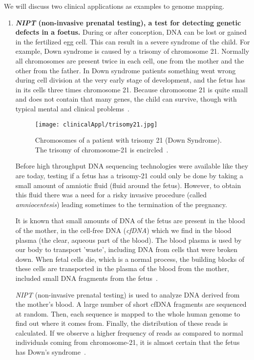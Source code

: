 We will discuss two clinical applications as examples to genome mapping.

\begin{enumerate}
	\item \textbf{\emph{NIPT} (non-invasive prenatal testing), a test for detecting genetic defects in a foetus.}\newline
	During or after conception, DNA can be lost or gained in the fertilized egg cell. This can result in a severe syndrome of the child. For example, Down syndrome is caused by a trisomy of chromosome 21. Normally all chromosomes are present twice in each cell, one from the mother and the other from the father. In Down syndrome patients something went wrong during cell division at the very early stage of development, and the fetus has in its cells three times chromosome 21. 
	Because chromosome 21 is quite small and does not contain that many genes, the child can survive, though with typical mental and clinical problems~\cite{Down}.
	
	\begin{figure}[H]
			\centering
		\texttt{[image: clinicalAppl/trisomy21.jpg]}
		\caption{Chromosomes of a patient with trisomy 21 (Down Syndrome). The trisomy of chromosome-21 is encircled~\cite{niptArtikel}.}
		\label{fig:tri21}
	\end{figure}
	
	
	Before high throughput DNA sequencing technologies were available like they are today, testing if a fetus has a trisomy-21 could only be done by taking a small amount of amniotic fluid (fluid around the fetus). However, to obtain this fluid there was a need for a risky invasive procedure (called \emph{amniocentesis}) leading sometimes to the termination of the pregnancy.
	
	It is known that small amounts of DNA of the fetus are present in the blood of the mother, in the cell-free DNA (\emph{cfDNA}) which we find in the blood plasma (the clear, aqueous part of the blood). The blood plasma is used by our body to transport 'waste', including DNA from cells that were broken down. When fetal cells die, which is a normal process, the building blocks of these cells are transported in the plasma of the blood from the mother, included small DNA fragments from the fetus~\cite{NIPT}.
	
	\emph{NIPT} (non-invasive prenatal testing) is used to analyze DNA derived from the mother's blood. A large number of short cfDNA fragments are sequenced at random.  Then, each sequence is mapped to the whole human genome to find out where it comes from. Finally, the distribution of these reads is calculated. If we observe a higher frequency of reads as compared to normal individuals coming from chromosome-21, it is almost certain that the fetus has Down's syndrome~\cite{NIPT}.
	

\end{enumerate}
